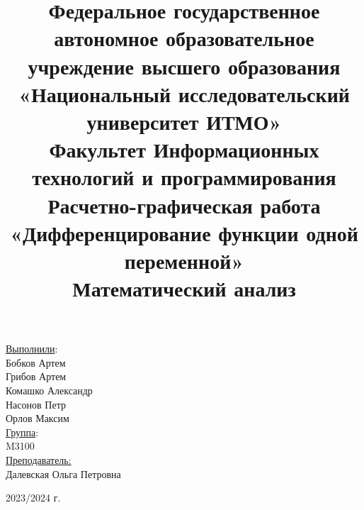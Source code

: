 \title{Федеральное государственное автономное образовательное учреждение высшего образования\\
«Национальный исследовательский университет ИТМО»\\
Факультет Информационных технологий и программирования\\[2\baselineskip]
Расчетно-графическая работа\\
\textbf{«Дифференцирование функции одной переменной»}\\
Математический анализ\\
}
\date{}
\author{}

\maketitle

\thispagestyle{empty}
\vfill
\begin{flushright}
  \begin{large}
\underline{Выполнили}:\\
Бобков Артем\\
Грибов Артем\\
Комашко Александр\\
Насонов Петр\\
Орлов Максим\\[1\baselineskip]

\underline{Группа}:\\
M3100\\[1\baselineskip]
\underline{Преподаватель:}\\
Далевская Ольга Петровна\\[3\baselineskip]

\end{large}

\end{flushright}
\begin{center} \begin{normalsize} 2023/2024 г. \\\end{normalsize} \end{center}

\clearpage

\pagestyle{plain}
